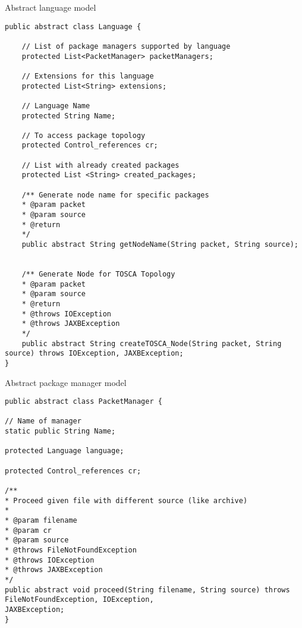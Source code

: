 \begin{Listing}
\caption{Abstract language model}
\label{lst:langabst}
\begin{lstlisting}
public abstract class Language {
	
	// List of package managers supported by language
	protected List<PacketManager> packetManagers;
	
	// Extensions for this language
	protected List<String> extensions;
	
	// Language Name
	protected String Name;
	
	// To access package topology
	protected Control_references cr;
	
	// List with already created packages
	protected List <String> created_packages;

	/**	Generate node name for specific packages
	* @param packet
	* @param source
	* @return
	*/
	public abstract String getNodeName(String packet, String source);
	
	
	/**	Generate Node for TOSCA Topology
	* @param packet
	* @param source
	* @return
	* @throws IOException
	* @throws JAXBException
	*/
	public abstract String createTOSCA_Node(String packet, String source) throws IOException, JAXBException;
}
\end{lstlisting}
\end{Listing}

\begin{Listing}
\caption{Abstract package manager model}
\label{lst:pmabst}
\begin{lstlisting}
public abstract class PacketManager {

// Name of manager
static public String Name;

protected Language language;

protected Control_references cr;

/**
* Proceed given file with different source (like archive)
* 
* @param filename
* @param cr
* @param source
* @throws FileNotFoundException
* @throws IOException
* @throws JAXBException
*/
public abstract void proceed(String filename, String source) throws FileNotFoundException, IOException,
JAXBException;
}
\end{lstlisting}
\end{Listing}


